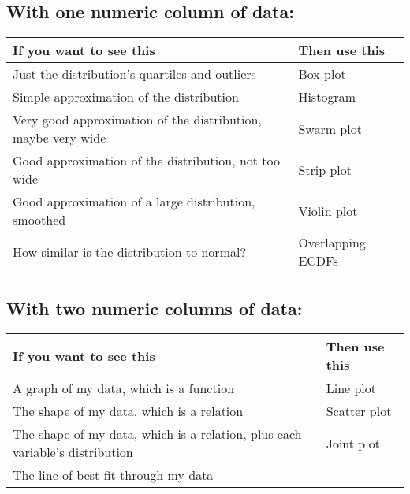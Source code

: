 \documentclass[letterpaper,10pt,english]{sphinxmanual}
\begin{document}
\subsection{With one numeric column of data:}
\label{\detokenize{chapter-10-visualization:with-one-numeric-column-of-data}}

\begin{savenotes}\sphinxattablestart
\centering
\begin{tabulary}{\linewidth}[t]{|T|T|}
\hline
\sphinxstyletheadfamily 
If you want to see this
&\sphinxstyletheadfamily 
Then use this
\\
\hline
Just the distribution’s quartiles and outliers
&
Box plot
\\
\hline
Simple approximation of the distribution
&
Histogram
\\
\hline
Very good approximation of the distribution, maybe very wide
&
Swarm plot
\\
\hline
Good approximation of the distribution, not too wide
&
Strip plot
\\
\hline
Good approximation of a large distribution, smoothed
&
Violin plot
\\
\hline
How similar is the distribution to normal?
&
Overlapping ECDFs
\\
\hline
\end{tabulary}
\par
\sphinxattableend\end{savenotes}


\subsection{With two numeric columns of data:}
\label{\detokenize{chapter-10-visualization:with-two-numeric-columns-of-data}}

\begin{savenotes}\sphinxattablestart
\centering
\begin{tabulary}{\linewidth}[t]{|T|T|}
\hline
\sphinxstyletheadfamily 
If you want to see this
&\sphinxstyletheadfamily 
Then use this
\\
\hline
A graph of my data, which is a function
&
Line plot
\\
\hline
The shape of my data, which is a relation
&
Scatter plot
\\
\hline
The shape of my data, which is a relation, plus each variable’s distribution
&
Joint plot
\\
\hline
The line of best fit through my data
&
\\
\hline
\end{tabulary}
\par
\sphinxattableend\end{savenotes}
\end{document}
